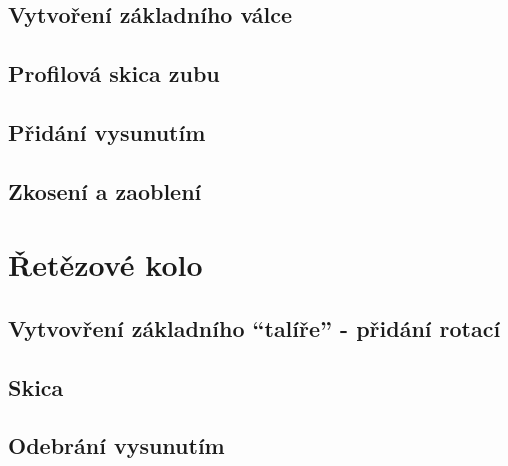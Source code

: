 \subsection*{Vytvoření základního válce}

\subsection*{Profilová skica zubu}

\subsection*{Přidání vysunutím}

\subsection*{Zkosení a zaoblení}

\section{Řetězové kolo}

\subsection*{Vytvovření základního \enquote{talíře} - přidání rotací}

\subsection*{Skica}

\subsection*{Odebrání vysunutím}

\newpage